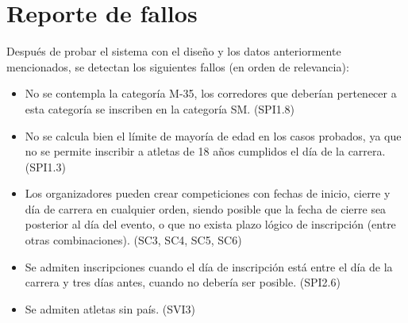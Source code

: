\chapter{Reporte de fallos}
Después de probar el sistema con el diseño y los datos anteriormente mencionados,
se detectan los siguientes fallos (en orden de relevancia):

\begin{itemize}
	\item No se contempla la categoría M-35, los corredores que deberían pertenecer a
		esta categoría se inscriben en la categoría SM. (SPI1.8)
	\item No se calcula bien el límite de mayoría de edad en los casos probados, ya que no se
		permite inscribir a atletas de 18 años cumplidos el día de la carrera. (SPI1.3)
	\item Los organizadores pueden crear competiciones con fechas de inicio, cierre y día de carrera
		en cualquier orden, siendo posible que la fecha de cierre sea posterior al día del evento, o
		que no exista plazo lógico de inscripción (entre otras combinaciones). (SC3, SC4, SC5, SC6)
	\item Se admiten inscripciones cuando el día de inscripción está entre el día de la carrera y
		tres días antes, cuando no debería ser posible. (SPI2.6)
	\item Se admiten atletas sin país. (SVI3)
\end{itemize}
